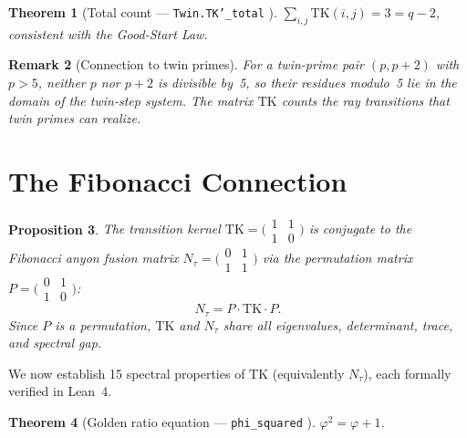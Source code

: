 \documentclass[11pt,a4paper]{article}
\newtheorem{theorem}{Theorem}[section]
\newtheorem{proposition}[theorem]{Proposition}
\newtheorem{remark}[theorem]{Remark}
\newcommand{\lean}[1]{\texttt{\small #1}}
\newcommand{\verified}{\textcolor{green!60!black}{\checkmark}}
\begin{document}
\begin{theorem}[Total count --- \lean{Twin.TK'\_total} \verified]\label{thm:total}
  $\sum_{i,j} \mathrm{TK}(i,j) = 3 = q - 2$, consistent with the Good-Start Law.
\end{theorem}

\begin{remark}[Connection to twin primes]
  For a twin-prime pair $(p, p+2)$ with $p > 5$, neither $p$ nor $p+2$ is
  divisible by~5, so their residues modulo~5 lie in the domain of the twin-step
  system. The matrix $\mathrm{TK}$ counts the ray transitions that twin primes
  can realize.
\end{remark}

\section{The Fibonacci Connection}\label{sec:fibonacci}

\begin{proposition}\label{prop:reindex}
  The transition kernel $\mathrm{TK} = \bigl(\begin{smallmatrix} 1 & 1 \\ 1 & 0 \end{smallmatrix}\bigr)$
  is conjugate to the Fibonacci anyon fusion matrix
  $N_\tau = \bigl(\begin{smallmatrix} 0 & 1 \\ 1 & 1 \end{smallmatrix}\bigr)$
  via the permutation matrix $P = \bigl(\begin{smallmatrix} 0 & 1 \\ 1 & 0 \end{smallmatrix}\bigr)$:
  \[
    N_\tau = P \cdot \mathrm{TK} \cdot P.
  \]
  Since $P$ is a permutation, $\mathrm{TK}$ and $N_\tau$ share all eigenvalues,
  determinant, trace, and spectral gap.
\end{proposition}

\noindent
We now establish 15 spectral properties of $\mathrm{TK}$ (equivalently $N_\tau$),
each formally verified in Lean~4.

\begin{theorem}[Golden ratio equation --- \lean{phi\_squared} \verified]\label{thm:phi2}
  $\varphi^2 = \varphi + 1$.
\end{theorem}
\end{document}
